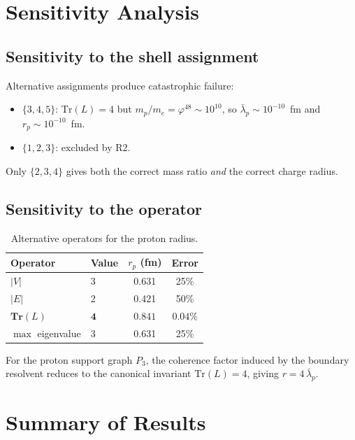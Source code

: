 \documentclass[12pt]{article}
\newcommand{\phig}{\varphi}
\newcommand{\lbar}{\bar{\lambda}}
\begin{document}
\section{Sensitivity Analysis}\label{sec:sensitivity}

\subsection{Sensitivity to the shell assignment}

Alternative assignments produce catastrophic failure:
\begin{itemize}
    \item $\{3,4,5\}$: $\mathrm{Tr}(L) = 4$ but $m_p/m_e = \phig^{48} \sim 10^{10}$, so $\lbar_p \sim 10^{-10}$~fm and $r_p \sim 10^{-10}$~fm.
    \item $\{1,2,3\}$: excluded by R2.
\end{itemize}
Only $\{2,3,4\}$ gives both the correct mass ratio \textit{and} the correct charge radius.

\subsection{Sensitivity to the operator}

\begin{table}[ht]
\centering
\caption{Alternative operators for the proton radius.}
\label{tab:operators}
\begin{tabular}{@{}llcc@{}}
\toprule
Operator & Value & $r_p$ (fm) & Error \\
\midrule
$|V|$ & 3 & 0.631 & 25\% \\
$|E|$ & 2 & 0.421 & 50\% \\
$\mathbf{Tr}(L)$ & $\mathbf{4}$ & $\mathbf{0.841}$ & $\mathbf{0.04\%}$ \\
$\max$ eigenvalue & 3 & 0.631 & 25\% \\
\bottomrule
\end{tabular}
\end{table}

For the proton support graph $P_3$, the coherence factor induced by the boundary resolvent reduces to the canonical invariant $\mathrm{Tr}(L) = 4$, giving $r = 4\,\lbar_p$.

\section{Summary of Results}\label{sec:results}
\end{document}
